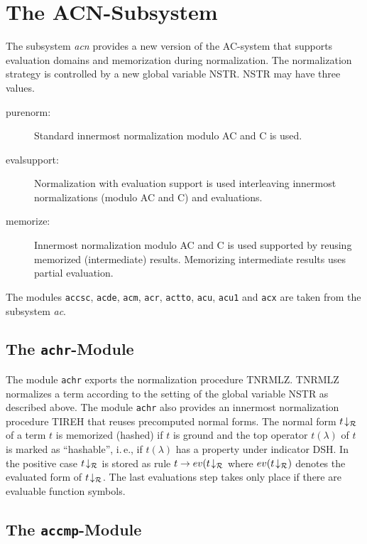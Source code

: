 \section{The ACN-Subsystem} \label{se:acn}

The subsystem {\it acn} provides a new version of the AC-system that
supports evaluation domains
and memorization
during normalization.
The normalization strategy is controlled by a new global variable NSTR.
NSTR may have three values.
\begin{description}
\item[purenorm:] Standard innermost normalization modulo AC and C is used.
\item[evalsupport:]  Normalization with evaluation support is used
                     interleaving innermost normalizations (modulo AC and C)
                     and evaluations.
\item[memorize:] Innermost normalization modulo AC and C is used supported
                  by reusing memorized (intermediate) results.
                  Memorizing intermediate results uses partial evaluation.
\end{description}
The modules {\tt accsc}, {\tt acde}, {\tt acm}, {\tt acr}, {\tt actto},
{\tt acu}, {\tt acu1} and {\tt acx} are taken from the subsystem {\it ac}.

\subsection{The {\tt achr}-Module}

The module {\tt achr} exports the normalization procedure TNRMLZ.
TNRMLZ normalizes a term according to the setting of the global variable
NSTR as described above.
The module {\tt achr} also provides an innermost normalization procedure
TIREH that reuses precomputed normal forms.
The normal form $t\!\downarrow_{\cal R}$ of a term $t$ is memorized (hashed)
if $t$ is ground and the top operator $t(\lambda)$ of $t$  is marked as
``hashable'', i.\,e., if $t(\lambda)$ has a property under indicator DSH.
In the positive case  $t\!\downarrow_{\cal R}$ is stored  as rule
\( t \rightarrow ev(t\!\downarrow_{\cal R} \) where 
$ev(t\!\downarrow_{\cal R})$ denotes the evaluated form of
$t\!\downarrow_{\cal R}$.
The last evaluations step takes only place if there are evaluable function
symbols.

\subsection{The {\tt accmp}-Module}

